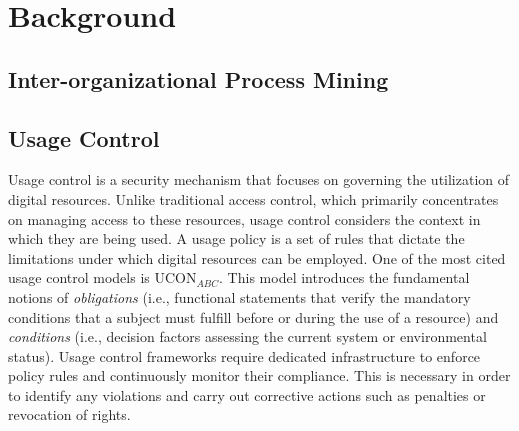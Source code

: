\section{Background}
\subsection{Inter-organizational Process Mining}

\subsection{Usage Control}
Usage control is a security mechanism that focuses on governing the utilization of digital resources. Unlike traditional access control, which primarily concentrates on managing access to these resources, usage control considers the context in which they are being used. A usage policy is a set of rules that dictate the limitations under which digital resources can be employed. One of the most cited usage control models is UCON$_{ABC}$. This model introduces the fundamental notions of \emph{obligations} (i.e., functional statements that verify the mandatory conditions that a subject must fulfill before or during the use of a resource) and \emph{conditions} (i.e., decision factors assessing the current system or environmental status). Usage control frameworks require dedicated infrastructure to enforce policy rules and continuously monitor their compliance. This is necessary in order to identify any violations and carry out corrective actions such as penalties or revocation of rights.


